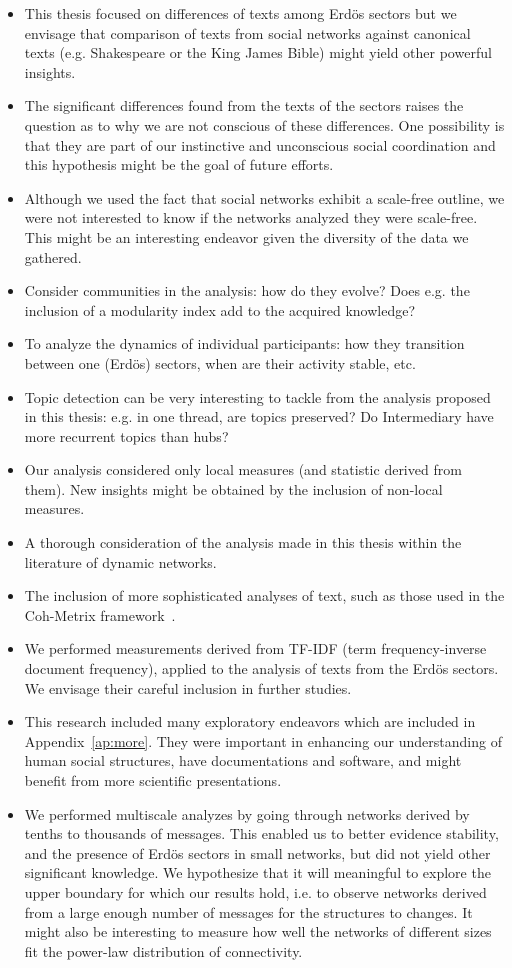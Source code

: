 \begin{itemize}
\item This thesis focused on differences of texts among Erd\"os sectors but we envisage that comparison of texts from social networks against canonical texts (e.g. Shakespeare or the King James Bible) might yield other powerful insights.
\item The significant differences found from the texts of the sectors raises the question as to why we are not conscious of these differences.
One possibility is that they are part of our instinctive and unconscious social coordination and this hypothesis might be the goal of future efforts.
\item Although we used the fact that social networks exhibit a scale-free outline,
	we were not interested to know if the networks analyzed they were scale-free.
		This might be an interesting endeavor given the diversity of the data we gathered.
\item Consider communities in the analysis: how do they evolve? Does e.g. the inclusion of a modularity index add to the acquired knowledge?
\item To analyze the dynamics of individual participants: how they transition between one (Erdös) sectors, when are their activity stable, etc.
\item Topic detection can be very interesting to tackle from the analysis proposed in this thesis:
	e.g. in one thread, are topics preserved? Do Intermediary have more recurrent topics than hubs?
\item Our analysis considered only local measures (and statistic derived from them).
	New insights might be obtained by the inclusion of non-local measures.
\item A thorough consideration of the analysis made in this thesis within the literature of dynamic networks.
\item The inclusion of more sophisticated analyses of text, such as those used in the Coh-Metrix framework~\cite{coh}.
\item We performed measurements derived from TF-IDF (term frequency-inverse document frequency),
	applied to the analysis of texts from the Erd\"os sectors.
		We envisage their careful inclusion in further studies.
	\item This research included many exploratory endeavors which are included in Appendix~\ref{ap:more}.
		They were important in enhancing our understanding of human social structures,
		have documentations and software, and might benefit from more scientific presentations.

\item We performed multiscale analyzes by going through networks derived by tenths to thousands of messages.
	This enabled us to better evidence stability, and the presence of Erd\"os sectors in small networks, 
		but did not yield other significant knowledge.
		We hypothesize that it will meaningful to explore the upper boundary for which our results hold,
		i.e. to observe networks derived from a large enough number of messages for the structures to changes.
		It might also be interesting to measure how well the networks of different sizes fit the power-law distribution
		of connectivity.
\end{itemize}







